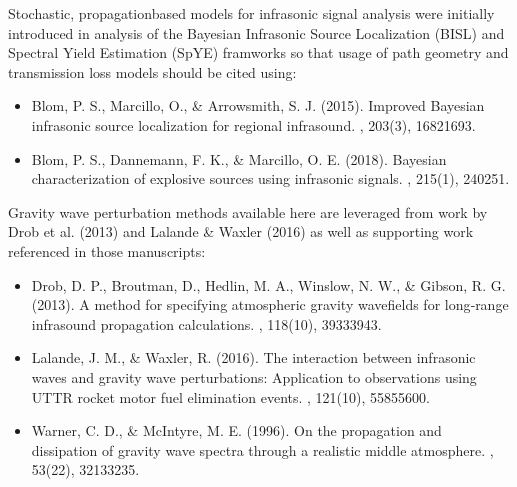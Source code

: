 \documentclass[letterpaper,10pt,english]{sphinxmanual}
\begin{document}
\sphinxAtStartPar
Stochastic, propagation\sphinxhyphen{}based models for infrasonic signal analysis were initially introduced in analysis of the Bayesian Infrasonic Source Localization (BISL) and Spectral Yield Estimation (SpYE) framworks so that usage of path geometry and transmission loss models should be cited using:
\begin{itemize}
\item {} 
\sphinxAtStartPar
Blom, P. S., Marcillo, O., \& Arrowsmith, S. J. (2015). Improved Bayesian infrasonic source localization for regional infrasound. , 203(3), 1682\sphinxhyphen{}1693.

\item {} 
\sphinxAtStartPar
Blom, P. S., Dannemann, F. K., \& Marcillo, O. E. (2018). Bayesian characterization of explosive sources using infrasonic signals. , 215(1), 240\sphinxhyphen{}251.

\end{itemize}

\sphinxAtStartPar
Gravity wave perturbation methods available here are leveraged from work by Drob et al. (2013) and Lalande \& Waxler (2016) as well as supporting work referenced in those manuscripts:
\begin{itemize}
\item {} 
\sphinxAtStartPar
Drob, D. P., Broutman, D., Hedlin, M. A., Winslow, N. W., \& Gibson, R. G. (2013). A method for specifying atmospheric gravity wavefields for long‐range infrasound propagation calculations. , 118(10), 3933\sphinxhyphen{}3943.

\item {} 
\sphinxAtStartPar
Lalande, J. M., \& Waxler, R. (2016). The interaction between infrasonic waves and gravity wave perturbations: Application to observations using UTTR rocket motor fuel elimination events. , 121(10), 5585\sphinxhyphen{}5600.

\item {} 
\sphinxAtStartPar
Warner, C. D., \& McIntyre, M. E. (1996). On the propagation and dissipation of gravity wave spectra through a realistic middle atmosphere. , 53(22), 3213\sphinxhyphen{}3235.

\end{itemize}
\end{document}
